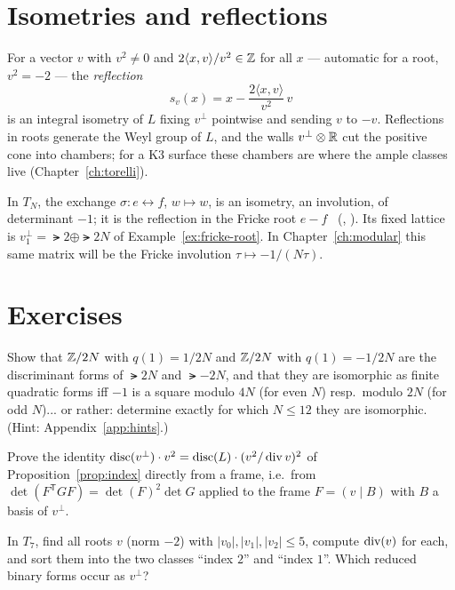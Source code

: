 \section{Isometries and reflections}

For a vector $v$ with $v^2\neq0$ and $2\langle x,v\rangle/v^2\in\mathbb{Z}$ for all
$x$ --- automatic for a root, $v^2=-2$ --- the \emph{reflection}
\[
  s_v(x)=x-\frac{2\langle x,v\rangle}{v^2}\,v
\]
is an integral isometry of $L$ fixing $v^{\perp}$ pointwise and sending $v$ to
$-v$. Reflections in roots generate the Weyl group of $L$, and the walls
$v^{\perp}\otimes\mathbb{R}$ cut the positive cone into chambers; for a K3 surface these
chambers are where the ample classes live (Chapter~\ref{ch:torelli}).

\begin{example}\label{ex:swap}
In $T_N$, the exchange $\sigma\colon e\leftrightarrow f$, $w\mapsto w$, is an
isometry, an involution, of determinant $-1$; it is the reflection in the
Fricke root $e-f$ \Kstatus~(,
). Its fixed lattice is $v_1^{\perp}=\lat2\oplus\lat{2N}$
of Example~\ref{ex:fricke-root}. In Chapter~\ref{ch:modular} this same matrix
will be the Fricke involution $\tau\mapsto-1/(N\tau)$.
\end{example}

\section{Exercises}

\begin{exercise}
Show that $\mathbb{Z}/2N$ with $q(1)=1/2N$ and $\mathbb{Z}/2N$ with $q(1)=-1/2N$ are the
discriminant forms of $\lat{2N}$ and $\lat{-2N}$, and that they are
isomorphic as finite quadratic forms iff $-1$ is a square modulo $4N$ (for
even $N$) resp.\ modulo $2N$ (for odd $N$)... or rather: determine exactly for
which $N\le 12$ they are isomorphic. (Hint: Appendix~\ref{app:hints}.)
\end{exercise}

\begin{exercise}[$\star$]\label{exr:disc-identity}
Prove the identity $\operatorname{disc}(v^{\perp})\cdot v^2=\operatorname{disc}(L)\cdot(v^2/\operatorname{div} v)^2$
of Proposition~\ref{prop:index} directly from a frame, i.e.\ from
$\det(F^{\mathsf T}GF)=\det(F)^2\det G$ applied to the frame $F=(v\mid B)$
with $B$ a basis of $v^{\perp}$.
\end{exercise}

\begin{exercise}
In $T_7$, find all roots $v$ (norm $-2$) with $|v_0|,|v_1|,|v_2|\le 5$, compute
$\operatorname{div}(v)$ for each, and sort them into the two classes ``index $2$'' and
``index $1$''. Which reduced binary forms occur as $v^{\perp}$?
\end{exercise}

